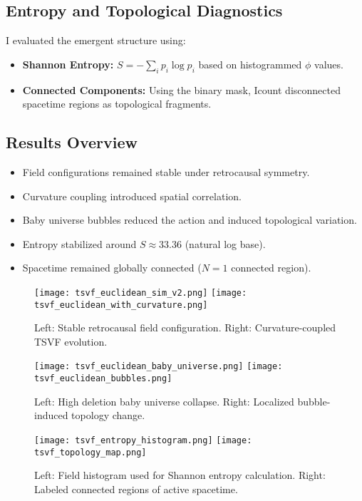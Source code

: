 \documentclass[twocolumn,superscriptaddress,floatfix]{revtex4-2}
\begin{document}
\subsection{Entropy and Topological Diagnostics}
I evaluated the emergent structure using:
\begin{itemize}
    \item \textbf{Shannon Entropy:} $S = -\sum_i p_i \log p_i$ based on histogrammed $\phi$ values.
    \item \textbf{Connected Components:} Using the binary mask, Icount disconnected spacetime regions as topological fragments.
\end{itemize}

\subsection{Results Overview}
\begin{itemize}
    \item Field configurations remained stable under retrocausal symmetry.
    \item Curvature coupling introduced spatial correlation.
    \item Baby universe bubbles reduced the action and induced topological variation.
    \item Entropy stabilized around $S \approx 33.36$ (natural log base).
    \item Spacetime remained globally connected ($N=1$ connected region).
\end{itemize}

\begin{figure}[h]
    \centering
    \texttt{[image: tsvf\_euclidean\_sim\_v2.png]}
    \texttt{[image: tsvf\_euclidean\_with\_curvature.png]}
    \caption{Left: Stable retrocausal field configuration. Right: Curvature-coupled TSVF evolution.}
    \label{fig:retrocausal_basic_curved}
\end{figure}

\begin{figure}[h]
    \centering
    \texttt{[image: tsvf\_euclidean\_baby\_universe.png]}
    \texttt{[image: tsvf\_euclidean\_bubbles.png]}
    \caption{Left: High deletion baby universe collapse. Right: Localized bubble-induced topology change.}
    \label{fig:retrocausal_topology_changes}
\end{figure}

\begin{figure}[h]
    \centering
    \texttt{[image: tsvf\_entropy\_histogram.png]}
    \texttt{[image: tsvf\_topology\_map.png]}
    \caption{Left: Field histogram used for Shannon entropy calculation. Right: Labeled connected regions of active spacetime.}
    \label{fig:entropy_and_topo_labels}
\end{figure}
\end{document}
